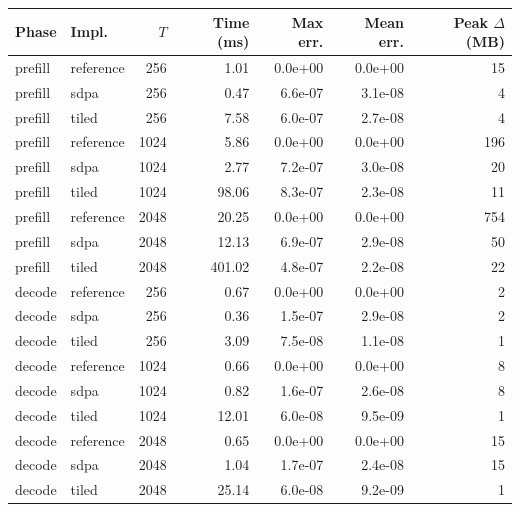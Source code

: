 \begin{tabular}{llrrrrr}\toprule
Phase & Impl. & $T$ & Time (ms) & Max err. & Mean err. & Peak $\Delta$ (MB) \\\midrule
prefill & reference & 256 & 1.01 & 0.0e+00 & 0.0e+00 & 15 \\
prefill & sdpa & 256 & 0.47 & 6.6e-07 & 3.1e-08 & 4 \\
prefill & tiled & 256 & 7.58 & 6.0e-07 & 2.7e-08 & 4 \\
prefill & reference & 1024 & 5.86 & 0.0e+00 & 0.0e+00 & 196 \\
prefill & sdpa & 1024 & 2.77 & 7.2e-07 & 3.0e-08 & 20 \\
prefill & tiled & 1024 & 98.06 & 8.3e-07 & 2.3e-08 & 11 \\
prefill & reference & 2048 & 20.25 & 0.0e+00 & 0.0e+00 & 754 \\
prefill & sdpa & 2048 & 12.13 & 6.9e-07 & 2.9e-08 & 50 \\
prefill & tiled & 2048 & 401.02 & 4.8e-07 & 2.2e-08 & 22 \\
\midrule
decode & reference & 256 & 0.67 & 0.0e+00 & 0.0e+00 & 2 \\
decode & sdpa & 256 & 0.36 & 1.5e-07 & 2.9e-08 & 2 \\
decode & tiled & 256 & 3.09 & 7.5e-08 & 1.1e-08 & 1 \\
decode & reference & 1024 & 0.66 & 0.0e+00 & 0.0e+00 & 8 \\
decode & sdpa & 1024 & 0.82 & 1.6e-07 & 2.6e-08 & 8 \\
decode & tiled & 1024 & 12.01 & 6.0e-08 & 9.5e-09 & 1 \\
decode & reference & 2048 & 0.65 & 0.0e+00 & 0.0e+00 & 15 \\
decode & sdpa & 2048 & 1.04 & 1.7e-07 & 2.4e-08 & 15 \\
decode & tiled & 2048 & 25.14 & 6.0e-08 & 9.2e-09 & 1 \\
\bottomrule\end{tabular}
